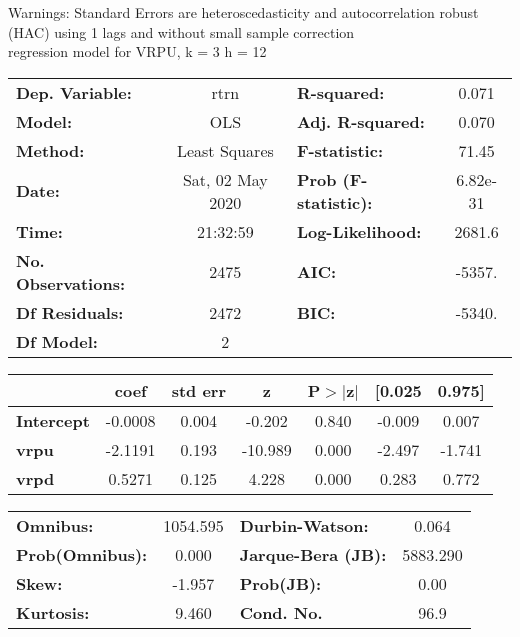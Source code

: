 Warnings: \newline
 [1] Standard Errors are heteroscedasticity and autocorrelation robust (HAC) using 1 lags and without small sample correction\\ 

regression model for VRPU, k = 3 h = 12\begin{center}
\begin{tabular}{lclc}
\toprule
\textbf{Dep. Variable:}    &       rtrn       & \textbf{  R-squared:         } &     0.071   \\
\textbf{Model:}            &       OLS        & \textbf{  Adj. R-squared:    } &     0.070   \\
\textbf{Method:}           &  Least Squares   & \textbf{  F-statistic:       } &     71.45   \\
\textbf{Date:}             & Sat, 02 May 2020 & \textbf{  Prob (F-statistic):} &  6.82e-31   \\
\textbf{Time:}             &     21:32:59     & \textbf{  Log-Likelihood:    } &    2681.6   \\
\textbf{No. Observations:} &        2475      & \textbf{  AIC:               } &    -5357.   \\
\textbf{Df Residuals:}     &        2472      & \textbf{  BIC:               } &    -5340.   \\
\textbf{Df Model:}         &           2      & \textbf{                     } &             \\
\bottomrule
\end{tabular}
\begin{tabular}{lcccccc}
                   & \textbf{coef} & \textbf{std err} & \textbf{z} & \textbf{P$> |$z$|$} & \textbf{[0.025} & \textbf{0.975]}  \\
\midrule
\textbf{Intercept} &      -0.0008  &        0.004     &    -0.202  &         0.840        &       -0.009    &        0.007     \\
\textbf{vrpu}      &      -2.1191  &        0.193     &   -10.989  &         0.000        &       -2.497    &       -1.741     \\
\textbf{vrpd}      &       0.5271  &        0.125     &     4.228  &         0.000        &        0.283    &        0.772     \\
\bottomrule
\end{tabular}
\begin{tabular}{lclc}
\textbf{Omnibus:}       & 1054.595 & \textbf{  Durbin-Watson:     } &    0.064  \\
\textbf{Prob(Omnibus):} &   0.000  & \textbf{  Jarque-Bera (JB):  } & 5883.290  \\
\textbf{Skew:}          &  -1.957  & \textbf{  Prob(JB):          } &     0.00  \\
\textbf{Kurtosis:}      &   9.460  & \textbf{  Cond. No.          } &     96.9  \\
\bottomrule
\end{tabular}
\end{center}

